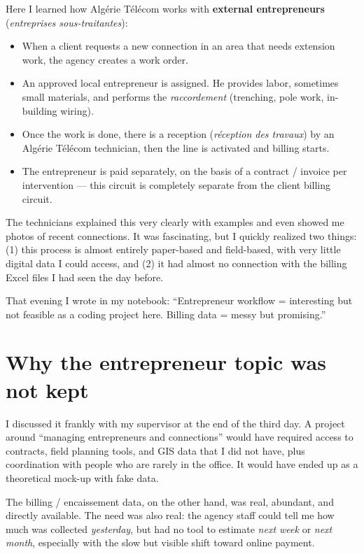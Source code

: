 \documentclass[12pt,a4paper]{report}
\begin{document}
Here I learned how Algérie Télécom works with \textbf{external entrepreneurs} (\textit{entreprises sous-traitantes}):

\begin{itemize}
\item When a client requests a new connection in an area that needs extension work, the agency creates a work order.
\item An approved local entrepreneur is assigned. He provides labor, sometimes small materials, and performs the \textit{raccordement} (trenching, pole work, in-building wiring).
\item Once the work is done, there is a reception (\textit{réception des travaux}) by an Algérie Télécom technician, then the line is activated and billing starts.
\item The entrepreneur is paid separately, on the basis of a contract / invoice per intervention --- this circuit is completely separate from the client billing circuit.
\end{itemize}

The technicians explained this very clearly with examples and even showed me photos of recent connections. It was fascinating, but I quickly realized two things: (1) this process is almost entirely paper-based and field-based, with very little digital data I could access, and (2) it had almost no connection with the billing Excel files I had seen the day before.

That evening I wrote in my notebook: ``Entrepreneur workflow = interesting but not feasible as a coding project here. Billing data = messy but promising.''

\section{Why the entrepreneur topic was not kept}

I discussed it frankly with my supervisor at the end of the third day. A project around ``managing entrepreneurs and connections'' would have required access to contracts, field planning tools, and GIS data that I did not have, plus coordination with people who are rarely in the office. It would have ended up as a theoretical mock-up with fake data.

The billing / encaissement data, on the other hand, was real, abundant, and directly available. The need was also real: the agency staff could tell me how much was collected \textit{yesterday}, but had no tool to estimate \textit{next week} or \textit{next month}, especially with the slow but visible shift toward online payment.
\end{document}
